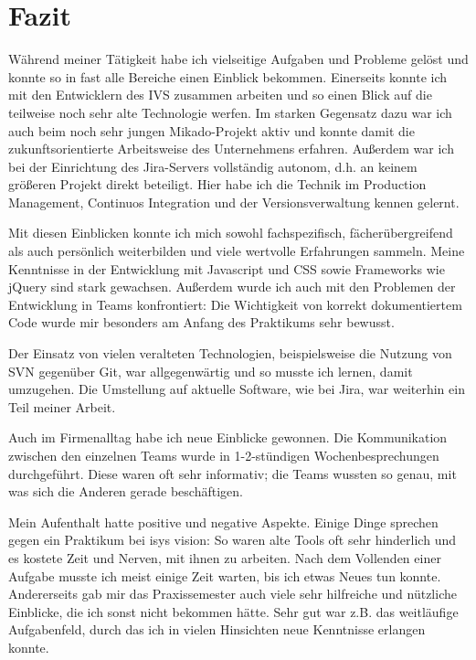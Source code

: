 \chapter{Fazit}
\label{ch:fazit}

Während meiner Tätigkeit habe ich vielseitige Aufgaben und Probleme gelöst und konnte so in fast alle Bereiche einen Einblick bekommen. Einerseits konnte ich mit den Entwicklern des IVS zusammen arbeiten und so einen Blick auf die teilweise noch sehr alte Technologie werfen. Im starken Gegensatz dazu war ich auch beim noch sehr jungen Mikado-Projekt aktiv und konnte damit die zukunftsorientierte Arbeitsweise des Unternehmens erfahren. Außerdem war ich bei der Einrichtung des Jira-Servers vollständig autonom, d.h. an keinem größeren Projekt direkt beteiligt. Hier habe ich die Technik im Production Management, Continuos Integration und der Versionsverwaltung kennen gelernt.

Mit diesen Einblicken konnte ich mich sowohl fachspezifisch, fächerübergreifend als auch persönlich weiterbilden und viele wertvolle Erfahrungen sammeln. Meine Kenntnisse in der Entwicklung mit Javascript und CSS sowie Frameworks wie jQuery sind stark gewachsen. Außerdem wurde ich auch mit den Problemen der Entwicklung in Teams konfrontiert: Die Wichtigkeit von korrekt dokumentiertem Code wurde mir besonders am Anfang des Praktikums sehr bewusst.

Der Einsatz von vielen veralteten Technologien, beispielsweise die Nutzung von SVN gegenüber Git, war allgegenwärtig und so musste ich lernen, damit umzugehen. Die Umstellung auf aktuelle Software, wie bei Jira, war weiterhin ein Teil meiner Arbeit.

Auch im Firmenalltag habe ich neue Einblicke gewonnen. Die Kommunikation zwischen den einzelnen Teams wurde in 1-2-stündigen Wochenbesprechungen durchgeführt. Diese waren oft sehr informativ; die Teams wussten so genau, mit was sich die Anderen gerade beschäftigen.

Mein Aufenthalt hatte positive und negative Aspekte. Einige Dinge sprechen gegen ein Praktikum bei isys vision: So waren alte Tools oft sehr hinderlich und es kostete Zeit und Nerven, mit ihnen zu arbeiten. Nach dem Vollenden einer Aufgabe musste ich meist einige Zeit warten, bis ich etwas Neues tun konnte.
Andererseits gab mir das Praxissemester auch viele sehr hilfreiche und nützliche Einblicke, die ich sonst nicht bekommen hätte. Sehr gut war z.B. das weitläufige Aufgabenfeld, durch das ich in vielen Hinsichten neue Kenntnisse erlangen konnte.